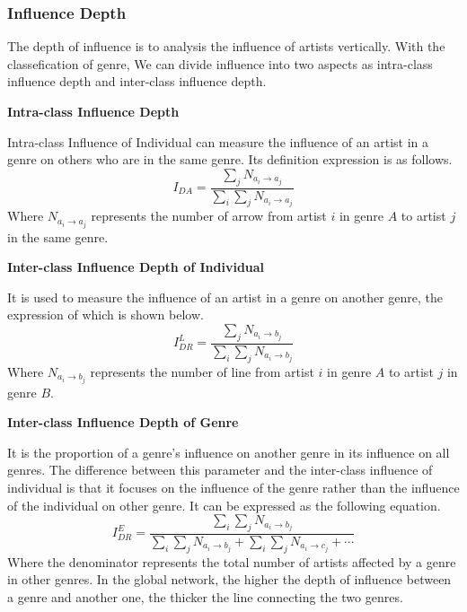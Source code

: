\documentclass{mcmthesis}
\begin{document}
\subsubsection{Influence Depth}
The depth of influence is to analysis the influence of artists vertically. With the classefication of genre, We can divide influence into two aspects as intra-class influence depth and inter-class influence depth.

\noindent%
\textbf{Intra-class Influence Depth}

Intra-class Influence of Individual can measure the influence of an artist in a genre on others who are in the same genre. Its definition expression is as follows.
\begin{equation}
{I_{DA}} = \frac{{\sum\limits_j {{N_{{a_i} \to {a_j}}}} }}{{\sum\limits_i {\sum\limits_j {{N_{{a_i} \to {a_j}}}} } }}
\end{equation}
Where ${{N_{{a_i} \to {a_j}}}}$ represents the number of arrow from artist $i$ in genre $A$ to artist $j$ in the same genre.

\noindent%
\textbf{Inter-class Influence Depth of Individual}

It is used to measure the influence of an artist in a genre on another genre, the expression of which is shown below.
\begin{equation}
I_{DR}^L = \frac{{\sum\limits_j {{N_{{a_i} \to {b_j}}}} }}{{\sum\limits_i {\sum\limits_j {{N_{{a_i} \to {b_j}}}} } }}
\end{equation}
Where ${{N_{{a_i} \to {b_j}}}}$ represents the number of line from artist $i$ in genre $A$ to artist $j$ in genre $B$. 

\noindent%
\textbf{Inter-class Influence Depth of Genre}

It is the proportion of a genre’s influence on another genre in its influence on all genres. The difference between this parameter and the inter-class influence of individual is that it focuses on the influence of the genre rather than the influence of the individual on other genre. It can be expressed as the following equation.
\begin{equation}
I_{DR}^E = \frac{{\sum\limits_i {\sum\limits_j {{N_{{a_i} \to {b_j}}}} } }}{{\sum\limits_i {\sum\limits_j {{N_{{a_i} \to {b_j}}}}  + \sum\limits_i {\sum\limits_j {{N_{{a_i} \to {c_j}}}}  +  \cdots } } }}
\end{equation}
Where the denominator represents the total number of artists affected by a genre in other genres. In the global network, the higher the depth of influence between a genre and another one, the thicker the line connecting the two genres.
\end{document}
